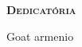 
\vspace*{45pt}
\begin{flushleft}
	{\Large \textbf{\scshape{Dedicat\'{o}ria}}}
\end{flushleft}
\vspace*{10pt}


Goat armenio

